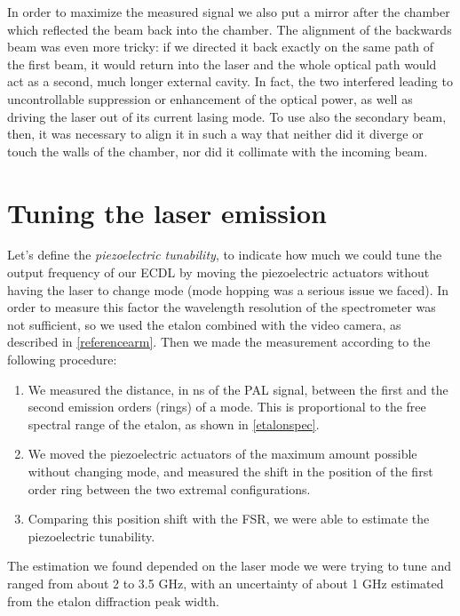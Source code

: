 \medskip
In order to maximize the measured signal we also put a mirror after the chamber which reflected the beam back into the chamber. The alignment of the backwards beam was even more tricky: if we directed it back exactly on the same path of the first beam, it would return into the laser and the whole optical path would act as a second, much longer external cavity. In fact, the two interfered leading to uncontrollable suppression or enhancement of the optical power, as well as driving the laser out of its current lasing mode. To use also the secondary beam, then, it was necessary to align it in such a way that neither did it diverge or touch the walls of the chamber, nor did it collimate with the incoming beam.

	\section{Tuning the laser emission}\label{tuna}
Let's define the \textit{piezoelectric tunability}, to indicate how much we could tune the output frequency of our ECDL by moving the piezoelectric actuators without having the laser to change mode (mode hopping was a serious issue we faced). In order to measure this factor the wavelength resolution of the spectrometer was not sufficient, so we used the etalon combined with the video camera, as described in \cref{referencearm}. Then we made the measurement according to the following procedure:
\begin{enumerate}
\item We measured the distance, in ns of the PAL signal, between the first and the second emission orders (rings) of a mode. This is proportional to the free spectral range of the etalon, as shown in \cref{etalonspec}.
\item We moved the piezoelectric actuators of the maximum amount possible without changing mode, and measured the shift in the position of the first order ring between the two extremal configurations.
\item Comparing this position shift with the FSR, we were able to estimate the piezoelectric tunability.
\end{enumerate}
The estimation we found depended on the laser mode we were trying to tune and ranged from about 2 to 3.5 GHz, with an uncertainty of about 1 GHz estimated from the etalon diffraction peak width.


